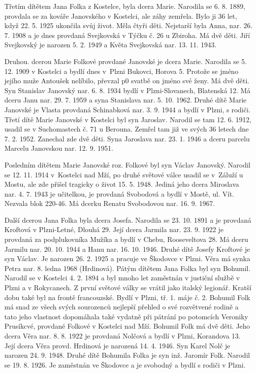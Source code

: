 \documentclass[../dejiny-rodu-prusiku.tex]{subfiles}
\begin{document}
Třetím dítětem Jana Folka z Kostelce, byla dcera Marie. Narodila se 6. 8. 1889, provdala se za kováře Janovského v Kostelci, ale záhy zemřela. Bylo ji 36 let, když 22. 5. 1925 ukončila svůj život. Měla čtyři děti. Nejstarší byla Anna, nar. 26. 7. 1908 a je dnes provdaná Svejkovská v Týčku č. 26 u Zbiroha. Má dvě děti. Jiří Svejkovský je narozen 5. 2. 1949 a Květa Svejkovská nar. 13. 11. 1943.

Druhou. dcerou Marie Folkové provdané Janovské je dcera Marie. Narodila se 5. 12. 1909 v Kostelci a bydlí dnes v Plzni Bukovci, Horova 5. Protože se jméno jejího muže Antoušek nelíbilo, převzal p0 svatbě on jméno své ženy. Má dvě děti. Syn Stanislav Janovský nar. 6. 8. 1934 bydlí v Plzni-Slovanech, Bla­tenská 12. Má dceru Janu nar. 29. 7. 1959 a syna Stanislava nar. 5. 10. 1962. Druhé dítě Marie Janovské je Vlasta provdaná Schinabková nar. 3. 9. 1944 a bydlí v Plzni, s rodiči. Třetí dítě Marie Janovské  v Kostel­ci byl syn Jaroslav. Narodil se tam 12. 6. 1912, usadil se v Suchomastech č. 71 u Berouna. Zemřel tam již ve svých 36 letech dne 7. 2. 1952. Zanechal zde dvě děti. Syna Jaroslava nar. 23. 1. 1946 a dceru parcelu Marcelu Janovskou nar. 12. 9. 1951.

Posledním dítětem Marie Janovské roz. Folkové byl syn Václav Janovský. Narodil se 12. 11. 1914 v Kostelci nad Mží, po druhé světové válce usadil se v Záluží u Mostu, ale zde přišel tragicky o život 15. 5. 1948. Jediná jeho dcera Miroslava nar. 4. 7. 1943 je učitel­kou, je provdaná Svobodová a bydlí v Mostě, ul. Vít. Nezvala blok 220-46. Má dcerku Renatu Svobodovou nar. 16. 9. 1967.

Další dcerou Jana Folka byla dcera Josefa. Narodila se 23. 10. 1891 a je provdaná Kroftová v Plzni-Letné, Dlouhá 29. Její dcera Jarmila nar. 23. 9. 1922 je provdaná za podplukovníka Mužíka a bydlí v Chebu, Roose­veltova 28. Má dceru Jarmilu nar. 20. 10. 1944 a Hanu nar. 16. 10. 1946. Druhé dítě Josefy Kroftové je syn Václav. Je narozen 26. 2. 1925 a pracuje ve Škodovce v Plzni. Věra má synka Petra nar. 8. ledna 1968 (Hrdinová). Pátým dítětem Jana Folka byl syn Bohumil. Narodil se v Kostelci 4. 2. 1894 a byl mnoho let zaměstnán v justiční službě v Plzni a v Rokycanech. Z první světové vál­ky se vrátil jako italský legionář. Kratší dobu také byl na frontě francouzské. Bydlí v Plzni, tř. 1. máje č. 2. Bohumil Folk má snad ze všech svých sourozenců nejlepší přehled o své rozvětvené rodině a tato jeho vlastnost dopomáhala také vydatně při pátrání po potomcích Veroni­ky Prusíkcvé, provdané Folkové v Kostelci nad Mží. Bohumil Folk má dvě děti. Jeho dcera Věra nar. 8. 8. 1922 je provdaná Nolčová a bydlí v Plzni, Korandova 13. Její dcera Věra provd. Hrdinová je narozená 14. 4. 1946. Syn Karel Nolč je narozen 24. 9. 1948. Druhé dítě Bohu­mila Folka je syn inž. Jaromír Folk. Narodil se 19. 8. 1926. Je zaměstnán ve Škodovce a je svobodný a bydlí s rodiči v Plzni.
\end{document}
